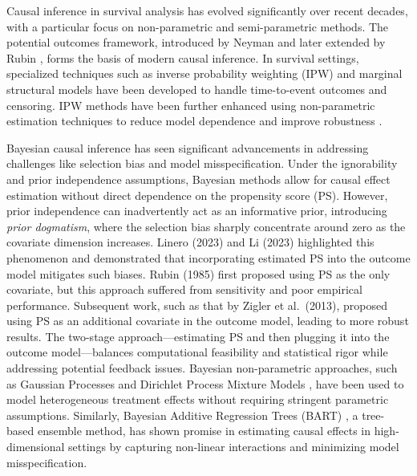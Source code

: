 \documentclass[useAMS,referee]{biom}
\begin{document}
Causal inference in survival analysis has evolved significantly over recent decades, with a particular focus on non-parametric and semi-parametric methods. The potential outcomes framework, introduced by Neyman \parencite{neyman1923application} and later extended by Rubin \parencite{rubin1974estimating}, forms the basis of modern causal inference. In survival settings, specialized techniques such as inverse probability weighting (IPW) \parencite{robins1992recovery} and marginal structural models \parencite{hernan2000marginal} have been developed to handle time-to-event outcomes and censoring. IPW methods have been further enhanced using non-parametric estimation techniques to reduce model dependence and improve robustness \parencite{van2000targeted}.

 Bayesian causal inference has seen significant advancements in addressing challenges like selection bias and model misspecification. Under the ignorability and prior independence assumptions, Bayesian methods allow for causal effect estimation without direct dependence on the propensity score (PS). However, prior independence can inadvertently act as an informative prior, introducing \emph{prior dogmatism}, where the selection bias sharply concentrate around zero as the covariate dimension increases. Linero (2023)\parencite{linero2022causal} and Li (2023)\parencite{li2023bayesian}  highlighted this phenomenon and demonstrated that incorporating estimated PS into the outcome model mitigates such biases. Rubin (1985) \cite{rubin1985propensity} first proposed using PS as the only covariate, but this approach suffered from sensitivity and poor empirical performance. Subsequent work, such as that by Zigler et al.\ (2013)\parencite{zigler2013model}, proposed using PS as an additional covariate in the outcome model, leading to more robust results. The two-stage approach---estimating PS and then plugging it into the outcome model---balances computational feasibility and statistical rigor while addressing potential feedback issues. Bayesian non-parametric approaches, such as Gaussian Processes \parencite{xu2017bayesian} and Dirichlet Process Mixture Models \parencite{kim2013bayesian}, have been used to model heterogeneous treatment effects without requiring stringent parametric assumptions. Similarly, Bayesian Additive Regression Trees (BART) \parencite{hill2011bayesian, Chipman10}, a tree-based ensemble method, has shown promise in estimating causal effects in high-dimensional settings by capturing non-linear interactions and minimizing model misspecification.
\end{document}
